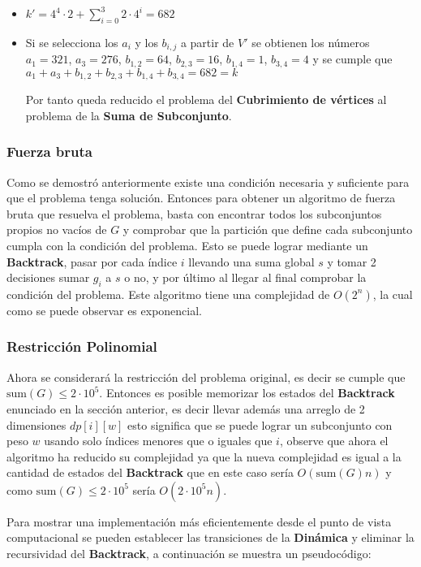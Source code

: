 \documentclass{article}
\begin{document}
\begin{itemize}
    \item $k'=4^{4}\cdot 2+\sum_{i=0}^{3}2\cdot 4^i=682$
    \item Si se selecciona los $a_i$ y los $b_{i,j}$ a partir de $V'$ se obtienen los números $a_1=321$, $a_3=276$, $b_{1,2}=64$, $b_{2,3}=16$, $b_{1,4}=1$, $b_{3,4}=4$
          y se cumple que  $a_1+a_3+b_{1,2}+b_{2,3}+b_{1,4}+b_{3,4}=682=k$

          Por tanto queda reducido el problema del \textbf{Cubrimiento de vértices} al problema de la \textbf{Suma de Subconjunto}.

\end{itemize}

\subsubsection{Fuerza bruta}

Como se demostró anteriormente existe una condición necesaria y suficiente para que el problema tenga solución. Entonces para obtener
un algoritmo de fuerza bruta que resuelva el problema, basta con encontrar todos los subconjuntos propios no vacíos de $G$ y comprobar que
la partición que define cada subconjunto cumpla con la condición del problema. Esto se puede lograr mediante un \textbf{Backtrack}, pasar por
cada índice $i$ llevando una suma global $s$ y tomar 2 decisiones sumar $g_i$ a $s$ o no, y por último al llegar al final comprobar la condición
del problema. Este algoritmo tiene una complejidad de $O(2^n)$, la cual como se puede observar es exponencial.

\subsubsection{Restricción Polinomial}

Ahora se considerará la restricción del problema original, es decir se cumple que $\text{sum}(G) \leq 2\cdot 10^5$. Entonces es posible
memorizar los estados del \textbf{Backtrack} enunciado en la sección anterior, es decir llevar además una arreglo de 2 dimensiones $dp[i][w]$ esto
significa que se puede lograr un subconjunto con peso $w$ usando solo índices menores que o iguales que $i$, observe que ahora el algoritmo ha reducido su complejidad ya que la nueva complejidad
es igual a la cantidad de estados del \textbf{Backtrack} que en este caso sería $O(\text{sum}(G)n)$ y como $\text{sum}(G) \leq 2\cdot 10^5$ sería
$O(2\cdot 10^5n)$.

Para mostrar una implementación más eficientemente desde el punto de vista computacional se pueden establecer las transiciones de la \textbf{Dinámica}
y eliminar la recursividad del \textbf{Backtrack}, a continuación se muestra un pseudocódigo:
\end{document}
